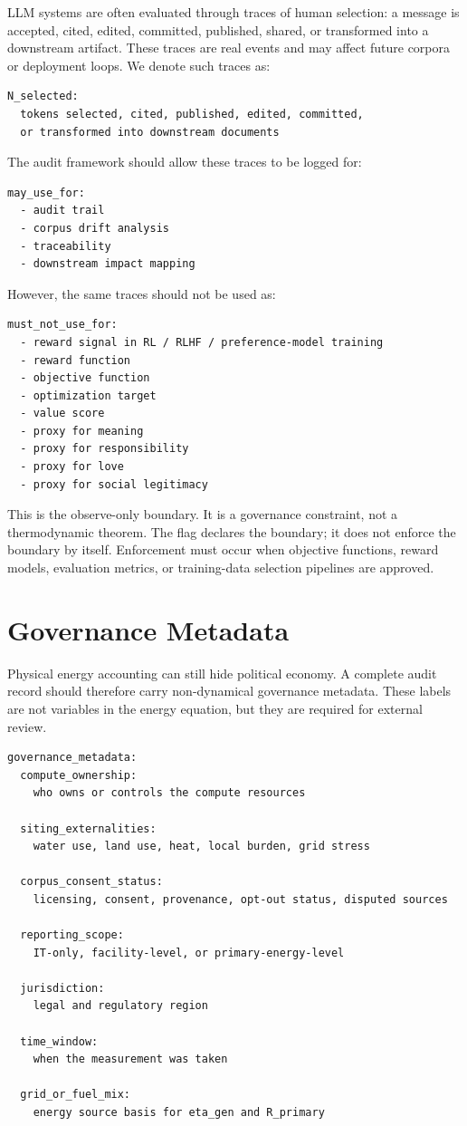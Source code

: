 \documentclass[11pt]{article}
\begin{document}
LLM systems are often evaluated through traces of human selection: a message is accepted, cited, edited, committed, published, shared, or transformed into a downstream artifact. These traces are real events and may affect future corpora or deployment loops. We denote such traces as:

\begin{verbatim}
N_selected:
  tokens selected, cited, published, edited, committed,
  or transformed into downstream documents
\end{verbatim}

The audit framework should allow these traces to be logged for:

\begin{verbatim}
may_use_for:
  - audit trail
  - corpus drift analysis
  - traceability
  - downstream impact mapping
\end{verbatim}

However, the same traces should not be used as:

\begin{verbatim}
must_not_use_for:
  - reward signal in RL / RLHF / preference-model training
  - reward function
  - objective function
  - optimization target
  - value score
  - proxy for meaning
  - proxy for responsibility
  - proxy for love
  - proxy for social legitimacy
\end{verbatim}

This is the observe-only boundary. It is a governance constraint, not a thermodynamic theorem. The flag declares the boundary; it does not enforce the boundary by itself. Enforcement must occur when objective functions, reward models, evaluation metrics, or training-data selection pipelines are approved.

\section{Governance Metadata}

Physical energy accounting can still hide political economy. A complete audit record should therefore carry non-dynamical governance metadata. These labels are not variables in the energy equation, but they are required for external review.

\begin{verbatim}
governance_metadata:
  compute_ownership:
    who owns or controls the compute resources

  siting_externalities:
    water use, land use, heat, local burden, grid stress

  corpus_consent_status:
    licensing, consent, provenance, opt-out status, disputed sources

  reporting_scope:
    IT-only, facility-level, or primary-energy-level

  jurisdiction:
    legal and regulatory region

  time_window:
    when the measurement was taken

  grid_or_fuel_mix:
    energy source basis for eta_gen and R_primary
\end{verbatim}
\end{document}
